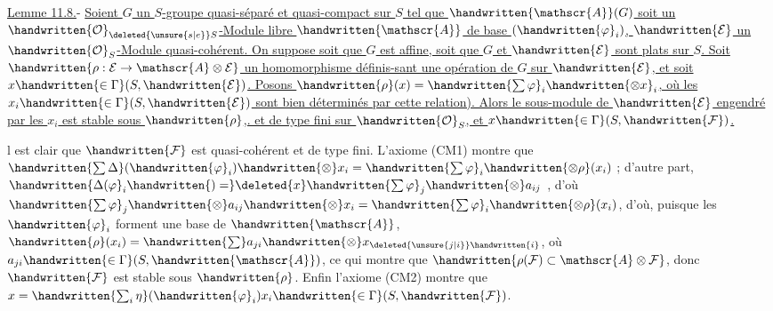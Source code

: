 \uline{Lemme 11.8.}- \uline{Soient $G$ un $S$-groupe quasi-séparé et quasi-compact sur $S$ tel que $\handwritten{\mathscr{A}}(G)$ soit un $\handwritten{\mathcal{O}}_{\deleted{\unsure{s|e}}S}$-Module  libre $\handwritten{\mathscr{A}}$ de base $(\handwritten{\varphi}_i)$, $\handwritten{\mathcal{E}}$ un $\handwritten{\mathcal{O}}_S$-Module quasi-cohérent. On suppose soit que $G$ est affine, soit que $G$ et $\handwritten{\mathcal{E}}$ sont plats sur $S$. Soit $\handwritten{\rho:\mathcal{E}\to\mathscr{A}\otimes\mathcal{E}}$ un homomorphisme définis-\linebreak sant une opération de $G$ sur $\handwritten{\mathcal{E}}$, et soit $x\handwritten{\in\Gamma}(S,\handwritten{\mathcal{E}})$. Posons $\handwritten{\rho}(x)=\handwritten{\sum\varphi}_i\handwritten{\otimes x}_i$, où les $x_i\handwritten{\in\Gamma}(S,\handwritten{\mathcal{E}})$ sont bien déterminés par cette relation). Alors le sous-module de $\handwritten{\mathcal{E}}$ engendré par les $x_i$ est stable sous $\handwritten{\rho}$,. et de type fini sur $\handwritten{\mathcal{O}}_S$, et $x\handwritten{\in\Gamma}(S,\handwritten{\mathcal{F}})$.}

 l est clair que $\handwritten{\mathcal{F}}$ est quasi-cohérent et de type fini. L'axiome (CM1) montre que $\handwritten{\sum\Delta}(\handwritten{\varphi}_i)\handwritten{\otimes}x_i=\handwritten{\sum\varphi}_i\handwritten{\otimes\rho}(x_i)$ ; d'autre part, $\handwritten{\Delta(\varphi}_i\handwritten{)=}\deleted{x}\handwritten{\sum\varphi}_j\handwritten{\otimes}a_{ij}$ , d'où $\handwritten{\sum\varphi}_j\handwritten{\otimes}a_{ij}\handwritten{\otimes}x_i=\handwritten{\sum\varphi}_i\handwritten{\otimes\rho}(x_i)$, d'où, puisque les $\handwritten{\varphi}_i$ forment une base de $\handwritten{\mathscr{A}}$, $\handwritten{\rho}(x_i)=\handwritten{\sum}a_{ji}\handwritten{\otimes}x_{\deleted{\unsure{j|i}}\handwritten{i}}$, où $a_{ji}\handwritten{\in\Gamma}(S,\handwritten{\mathscr{A}})$, ce qui montre que $\handwritten{\rho(\mathcal{F})\subset\mathscr{A}\otimes\mathcal{F}}$, donc $\handwritten{\mathcal{F}}$ est stable sous $\handwritten{\rho}$. Enfin l'axiome (CM2) montre que $x=\handwritten{\sum_i\eta}(\handwritten{\varphi}_i)x_i\handwritten{\in\Gamma}(S,\handwritten{\mathcal{F}})$.

